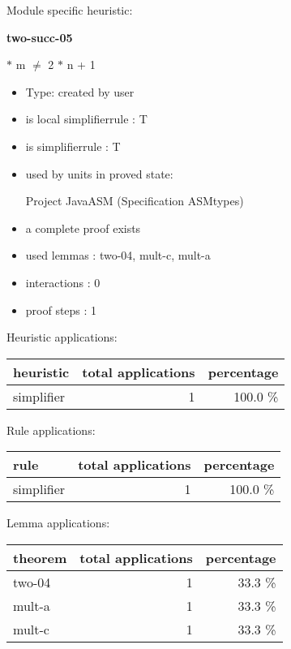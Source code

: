 \documentclass[a4paper]{article}
\begin{document}
Module specific heuristic:

\pagebreak

{\LARGE\bf two-succ-05}\label{lemma-two-succ-05}

\medskip

  $*$ m $\neq$ 2 $*$ n + 1

\begin{itemize}

\item Type: created by user

\item is local simplifierrule : T
\item is simplifierrule : T
\item used by units in proved state:

Project JavaASM (Specification ASMtypes)
\item       a complete proof exists
\item       used lemmas  : two-04, mult-c, mult-a
\item       interactions : 0
\item       proof steps  : 1
\end{itemize}

\medskip


Heuristic applications:

\begin{supertabular}{l|r|r}
heuristic	& total applications & percentage \\ \hline
simplifier & 1 & 100.0 \% \\

\end{supertabular}

Rule applications:

\begin{supertabular}{l|r|r}
rule	        & total applications & percentage \\ \hline
simplifier & 1 & 100.0 \% \\

\end{supertabular}

Lemma applications:

\begin{supertabular}{l|r|r}
theorem	        & total applications & percentage \\ \hline
two-04 & 1 & 33.3 \% \\
mult-a & 1 & 33.3 \% \\
mult-c & 1 & 33.3 \% \\

\end{supertabular}
\end{document}
